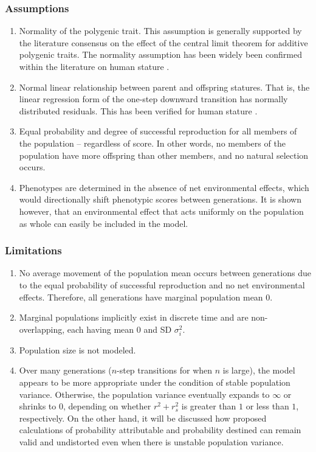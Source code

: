 \documentclass[letterpaper,10pt]{article} %
\begin{document}
\subsubsection*{Assumptions}
\begin{enumerate}
\item Normality of the polygenic trait. This assumption is generally supported by the literature consensus on the effect of the central limit theorem for additive polygenic traits. The normality assumption has been widely been confirmed within the literature on human stature \cite{luo}.
\item Normal linear relationship between parent and offspring statures. That is, the linear regression form of the one-step downward transition has normally distributed residuals. This has been verified for human stature \cite{luo}.
\item Equal probability and degree of successful reproduction for all members of the population -- regardless of score. In other words, no members of the population have more offspring than other members, and no natural selection occurs. 
\item Phenotypes are determined in the absence of net environmental effects, which would directionally shift phenotypic scores between generations. It is shown however, that an environmental effect that acts uniformly on the population as whole can easily be included in the model. 
\end{enumerate}

\subsubsection*{Limitations}
\begin{enumerate}
\item No average movement of the population mean occurs between generations due to the equal probability of successful reproduction and no net environmental effects. Therefore, all generations have marginal population mean $0$.
\item Marginal populations implicitly exist in discrete time and are non-overlapping, each having mean $0$ and SD $\sigma_i^2$.
\item Population size is not modeled. 
\item Over many generations ($n$-step transitions for when $n$ is large), the model appears to be more appropriate under the condition of stable population variance. Otherwise, the population variance eventually expands to $\infty$ or shrinks to $0$, depending on whether $r^2 + r_s^2$ is greater than $1$ or less than $1$, respectively. On the other hand, it will be discussed how proposed calculations of probability attributable and probability destined can remain valid and undistorted even when there is unstable population variance.
\end{enumerate}
\end{document}
